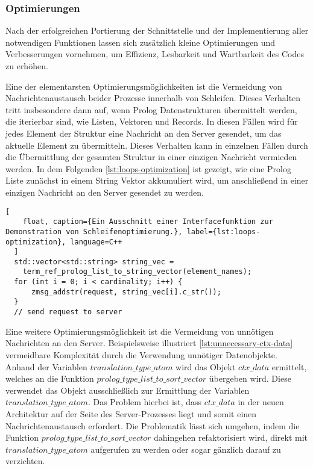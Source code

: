 \subsubsection{Optimierungen}
\label{subsec:optimizations}
Nach der erfolgreichen Portierung der Schnittstelle und der Implementierung aller notwendigen Funktionen
lassen sich zusätzlich kleine Optimierungen und Verbesserungen vornehmen, um Effizienz, Lesbarkeit und Wartbarkeit des Codes zu erhöhen.

Eine der elementarsten Optimierungsmöglichkeiten ist die Vermeidung von Nachrichtenaustausch beider Prozesse
innerhalb von Schleifen. Dieses Verhalten tritt insbesondere dann auf, wenn Prolog Datenstrukturen übermittelt werden,
die iterierbar sind, wie Listen, Vektoren und Records.
In diesen Fällen wird für jedes Element der Struktur eine Nachricht an den Server gesendet,
um das aktuelle Element zu übermitteln.
Dieses Verhalten kann in einzelnen Fällen durch die Übermittlung der gesamten Struktur in einer einzigen Nachricht vermieden werden.
In dem Folgenden \cref{lst:loops-optimization} ist gezeigt, wie eine Prolog Liste zunächst in einem String Vektor akkumuliert wird,
um anschließend in einer einzigen Nachricht an den Server gesendet zu werden.

\begin{lstlisting}[
    float, caption={Ein Ausschnitt einer Interfacefunktion zur Demonstration von Schleifenoptimierung.}, label={lst:loops-optimization}, language=C++
  ]
  std::vector<std::string> string_vec = 
    term_ref_prolog_list_to_string_vector(element_names);
  for (int i = 0; i < cardinality; i++) {
      zmsg_addstr(request, string_vec[i].c_str());
  }
  // send request to server
\end{lstlisting}
Eine weitere Optimierungsmöglichkeit ist die Vermeidung von unnötigen Nachrichten an den Server.
Beispielsweise illustriert \cref{lst:unnecessary-ctx-data} vermeidbare Komplexität durch die Verwendung unnötiger Datenobjekte.
Anhand der Variablen $translation\_type\_atom$ wird das Objekt $ctx\_data$ ermittelt, welches an die Funktion $prolog\_type\_list\_to\_sort\_vector$ übergeben wird.
Diese verwendet das Objekt ausschließlich zur Ermittlung der Variablen $translation\_type\_atom$. Das Problem hierbei ist,
dass $ctx\_data$ in der neuen Architektur auf der Seite des Server-Prozesses liegt und somit einen Nachrichtenaustausch erfordert.
Die Problematik lässt sich umgehen, indem die Funktion $prolog\_type\_list\_to\_sort\_vector$ dahingehen refaktorisiert wird,
direkt mit $translation\_type\_atom$ aufgerufen zu werden oder sogar gänzlich darauf zu verzichten.

